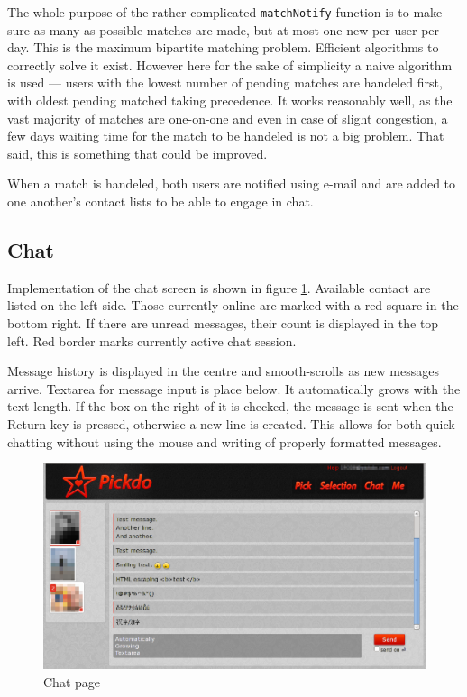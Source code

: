 \documentclass[12pt,oneside]{fithesis}
\begin{document}
		The whole purpose of the rather complicated \texttt{matchNotify} function is to make sure as many as possible matches are made, but at most one new per user per day. This is the maximum bipartite matching problem. Efficient algorithms to correctly solve it exist. \cite{Galil1986} However here for the sake of simplicity a naive algorithm is used --- users with the lowest number of pending matches are handeled first, with oldest pending matched taking precedence. It works reasonably well, as the vast majority of matches are one-on-one and even in case of slight congestion, a few days waiting time for the match to be handeled is not a big problem. That said, this is something that could be improved.
		
		When a match is handeled, both users are notified using e-mail and are added to one another's contact lists to be able to engage in chat.
	\subsection{Chat}
		Implementation of the chat screen is shown in figure \ref{fig:screen-chat}.	Available contact are listed on the left side. Those currently online are marked with a red square in the bottom right. If there are unread messages, their count is displayed in the top left. Red border marks currently active chat session.
		
		Message history is displayed in the centre and smooth-scrolls as new messages arrive. Textarea for message input is place below. It automatically grows with the text length. If the box on the right of it is checked, the message is sent when the Return key is pressed, otherwise a new line is created. This allows for both quick chatting without using the mouse and writing of properly formatted messages.
	
		\label{section:chat}
		\begin{figure}[h]
	  \centering
	    \includegraphics[width=1.0\textwidth]{screen-chat.png}
		  \caption{Chat page}
		  \label{fig:screen-chat}
	  \end{figure}
	  
\end{document}
